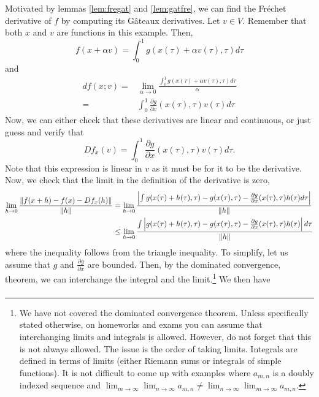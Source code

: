 \begin{example*}
  Motivated by lemmas \ref{lem:fregat} and \ref{lem:gatfre}, we can
  find the Fr\'{e}chet derivative of $f$ by computing its G\^{a}teaux
  derivatives. Let $v \in V$. Remember that both $x$ and $v$ are
  functions in this example. Then,
  \[ f(x+\alpha v) = \int_{0}^1 g(x(\tau) + \alpha v(\tau), \tau)
  d\tau \]
  and
  \begin{align*}
    df(x;v) = & \lim_{\alpha \to 0} \frac{\int_0^1 g(x(\tau) + \alpha
      v(\tau), \tau) d\tau}{\alpha} \\
    = & \int_0^1 \frac{\partial g}{\partial x}(x(\tau),\tau) v(\tau)
    d\tau
  \end{align*}    
  Now, we can either check that these derivatives are linear and
  continuous, or just guess and verify that
  \[ Df_x(v) = \int_0^1 \frac{\partial g}{\partial x}(x(\tau),\tau)
  v(\tau) d\tau. \]
  Note that this expression is linear in $v$ as it must be for it to
  be the derivative. Now, we check that the limit in the definition of
  the derivative is zero,
  \begin{align*}
    \lim_{h {\rightarrow} 0} \frac{\left\Vert {f(x+h) - f(x) - Df_x(h) } \right\Vert}{\left\Vert {h} \right\Vert} & = 
      \lim_{h {\rightarrow} 0} \frac{ \left\vert { \int g(x(\tau) + h(\tau), \tau) -
        g(x(\tau),\tau) - \frac{\partial g}{\partial x}(x(\tau),\tau)
        h(\tau) d\tau} \right\vert } {\left\Vert {h} \right\Vert} \\ 
    & \leq \lim_{h {\rightarrow} 0} \frac{  \int \left\vert { g(x(\tau) + h(\tau), \tau) -
        g(x(\tau),\tau) - \frac{\partial g}{\partial x}(x(\tau),\tau)
        h(\tau)} \right\vert d\tau } {\left\Vert {h} \right\Vert} 
  \end{align*}
  where the inequality follows from the triangle inequality.  To
  simplify, let us assume that $g$ and $\frac{\partial g}{\partial x}$
  are bounded. Then, by the dominated convergence, theorem, we can
  interchange the integral and the limit.\footnote{We have not covered
    the dominated convergence theorem. Unless specifically stated
    otherwise, on homeworks and exams you can assume that
    interchanging limits and integrals is allowed. However, do not
    forget that this is not always allowed. The issue is the order of
    taking limits. Integrals are defined in terms of limits (either
    Riemann sums or integrals of simple functions). It is not
    difficult to come up with examples where $a_{m,n}$ is a doubly
    indexed sequence and $\lim_{m \to \infty} \lim_{n \to \infty}
    a_{m,n} \neq \lim_{n \to \infty} \lim_{m \to \infty} a_{m,n}$.  
  } 
  We then have
  \begin{align*}

\end{align*}
\end{example*}
